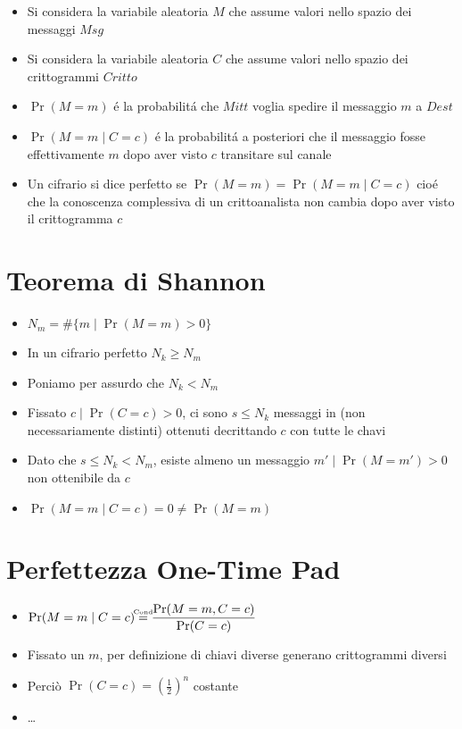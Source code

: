 \begin{itemize}
    \item Si considera la variabile aleatoria $M$ che assume valori nello spazio dei messaggi $Msg$
    \item Si considera la variabile aleatoria $C$ che assume valori nello spazio dei crittogrammi $Critto$
    \item $\Pr(M = m)$ \'e la probabilit\'a che $Mitt$ voglia spedire il messaggio $m$ a $Dest$
    \item $\Pr(M = m \mid C = c)$ \'e la probabilit\'a a posteriori che il messaggio fosse effettivamente $m$ dopo aver visto $c$ transitare sul canale
    \item Un cifrario si dice perfetto se $\Pr(M = m) = \Pr(M = m \mid C = c)$ cio\'e che la conoscenza complessiva di un crittoanalista non cambia dopo aver visto il crittogramma $c$
\end{itemize}

\section{Teorema di Shannon}

\begin{itemize}
    \item $N_m = \#\{m \mid \Pr(M = m) > 0\}$ 
    \item In un cifrario perfetto $N_k \geq N_m$
    \item Poniamo per assurdo che $N_k < N_m$
    \item Fissato $c \mid \Pr(C = c) > 0$, ci sono $s \leq N_k$ messaggi in (non necessariamente distinti) ottenuti decrittando $c$ con tutte le chavi
    \item Dato che $s \leq N_k < N_m$, esiste almeno un messaggio $m' \mid \Pr(M = m') > 0$ non ottenibile da $c$
    \item $\Pr(M = m \mid C = c) = 0 \not= \Pr(M = m)$
\end{itemize}

\section{Perfettezza One-Time Pad}

\begin{itemize}
    \item $\Pr(M = m \mid C = c) \de{Cond} \dfrac{\Pr(M = m, C = c)}{\Pr(C = c)}$
    \item Fissato un $m$, per definizione di  chiavi diverse generano crittogrammi diversi
    \item Perci\`o $\Pr(C = c) = (\frac{1}{2})^n$ costante
    \item \dots
\end{itemize}

